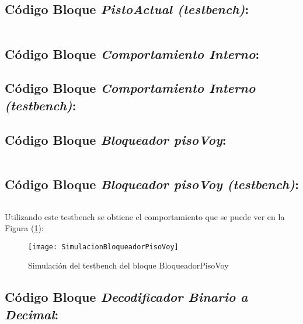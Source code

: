 \subsection{Código Bloque \textit{PistoActual (testbench)}:} \label{code:PisoActual_tb}
    \inputminted[frame=lines,fontsize=\footnotesize,linenos]{vhdl}{CodeFiles/PisoActual_tb.vhd}
    
\subsection{Código Bloque \textit{Comportamiento Interno}:} \label{code:ComportamientoInterno}

\subsection{Código Bloque \textit{Comportamiento Interno (testbench)}:} \label{code:ComportamientoInterno_tb}

\subsection{Código Bloque \textit{Bloqueador pisoVoy}:} \label{code:BloqueadorpisoVoy}	
    \inputminted[frame=lines,fontsize=\footnotesize,linenos]{vhdl}{CodeFiles/BloqueadorpisoVoy.vhd}

\subsection{Código Bloque \textit{Bloqueador pisoVoy (testbench)}:} \label{code:BloqueadorpisoVoy_tb}
    \inputminted[frame=lines,fontsize=\footnotesize,linenos]{vhdl}{CodeFiles/BloqueadorpisoVoy_tb.vhd}

    Utilizando este testbench se obtiene el comportamiento que se puede ver en la Figura (\ref{fig:SimulacionBloqueadorPisoVoy}):

    \begin{figure}[H]
		    \centering
		    \texttt{[image: SimulacionBloqueadorPisoVoy]}
		    \caption{Simulación del testbench del bloque BloqueadorPisoVoy}
		    \label{fig:SimulacionBloqueadorPisoVoy}
	\end{figure}

\subsection{Código Bloque \textit{Decodificador Binario a Decimal}:} \label{code:DecodificadorBinarioDecimal}
    \inputminted[frame=lines,fontsize=\footnotesize,linenos]{vhdl}{CodeFiles/DecodificadorBinarioDecimal.vhd}
    
